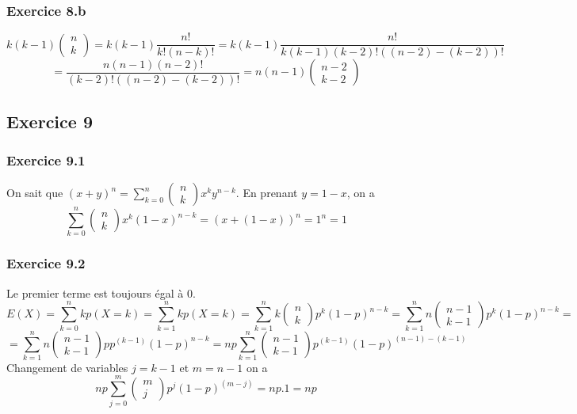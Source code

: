 \documentclass[]{book}
\theoremstyle{definition}
\begin{document}
\subsubsection*{Exercice 8.b}
$$k(k-1)\begin{pmatrix}n\\k\end{pmatrix} = k(k-1)\frac{n!}{k!(n-k)!} = k(k-1)\frac{n!}{k(k-1)(k-2)!((n-2)-(k-2))!} $$
$$= \frac{n(n-1)(n-2)!}{(k-2)!((n-2)-(k-2))!} = n(n-1)\begin{pmatrix}n-2\\k-2\end{pmatrix}$$

\subsection*{Exercice 9}
\subsubsection*{Exercice 9.1}
On sait que $(x+y)^n = \sum_{k=0}^{n}{\begin{pmatrix}n\\k\end{pmatrix}x^ky^{n-k}}$. En prenant $y = 1-x$, on a
$$\sum_{k=0}^{n}{\begin{pmatrix}n\\k\end{pmatrix}x^k(1-x)^{n-k}} = (x+(1-x))^n = 1^n = 1$$

\subsubsection*{Exercice 9.2}
Le premier terme est toujours \'egal \`a 0.
$$E(X) = \sum_{k=0}^{n}{kp(X=k)} = \sum_{k=1}^{n}{kp(X=k)} = \sum_{k=1}^{n}{k\begin{pmatrix}n\\k\end{pmatrix}p^k(1-p)^{n-k}} = \sum_{k=1}^{n}{n\begin{pmatrix}n-1\\k-1\end{pmatrix}p^k(1-p)^{n-k}} =$$
$$=\sum_{k=1}^{n}{n\begin{pmatrix}n-1\\k-1\end{pmatrix}pp^{(k-1)}(1-p)^{n-k}} = np\sum_{k=1}^{n}{\begin{pmatrix}n-1\\k-1\end{pmatrix}p^{(k-1)}(1-p)^{(n-1)-(k-1)}}$$
Changement de variables $j=k-1$ et $m=n-1$ on a 
$$np\sum_{j=0}^{m}{\begin{pmatrix}m\\j\end{pmatrix}p^{j}(1-p)^{(m-j)}} = np.1 = np$$
\end{document}
